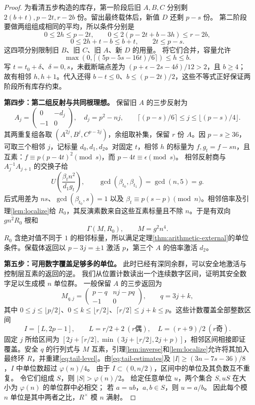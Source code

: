 \documentclass[11pt,a4paper,oneside,openany]{book}
\theoremstyle{definition}
\numberwithin{equation}{chapter}
\begin{document}
\begin{proof}
为看清五步构造的库存，第一阶段后旧 $A,B,C$ 分别剩
$2(b+t),p-2t,r-2b$ 份。留出最终载体后，新值 $D$ 还剩 $p-s$ 份。
第二阶段要做两组组成相同的平均，所以条件分别是
\[
0\le2h\le p-2t,\qquad
0\le2(p-2t+b-3h)\le r-2b,
\]
\[
0\le2h+t-b\le b+t,\qquad 2t\le p-s.
\]
这四项分别限制旧 $B$、旧 $C$、旧 $A$、新 $D$ 的用量。
将它们合并，容量允许
\[
\max(0,\lceil(5p-5s-16t)/6\rceil)\le h\le b.
\]
写 $t=t_0+\delta$、$\delta=0,s$，未截断端点差为 $(p+\epsilon-2s-4\delta)/12>2$，且 $b\ge4$；故有相邻 $h,h+1$。代入还得 $b-t\le0$、$b\le(p-2t)/2$，这些不等式正好保证两阶段所有库存约束。


\par\noindent\textbf{第四步：第二组反射与共同根理想。}
保留旧 $A$ 的三步反射为
\[
A_j=\begin{pmatrix}0&-d_j\\-1&0\end{pmatrix},\quad d_j=p^2-nj,\qquad
\lceil(p-s)/6\rceil\le j\le\lfloor(p-s)/4\rfloor.
\]
其两重复组各取 $(A^{2j},B^j,C^{p-3j})$，余组取补集，保留 $r$ 份 $A$。因 $p-s\ge36$，可取三个相邻 $j$，记标量 $d_0,d_1,d_2$。对固定 $t$，相邻 $h$ 的标量为 $f,g_t=f-sn$，且互素：$f\equiv p(p-4t)^2\pmod s$，而 $p-4t\equiv\epsilon\pmod s$。
相邻反射商与 $A_j^{-1}A_{j+1}$ 的交换子给
\[
U\left(\frac{\beta_t n^2}{d_1g_t}\right),\qquad
\gcd(\beta_{t_0},\beta_{t_1})=\gcd(n,5)=g.
\]
后式用差为 $ns$、$\gcd(\beta_{t_0},s)=1$ 以及 $\beta_t\equiv p(s-p)\pmod n$。相邻倍率及引理\ref{lem:localize}给 $R_0$，其反演素数来自这些互素标量且不除 $n$。于是有双向 $gn^2R_0$ 根和
\begin{equation}\label{eq:tail-level}
\Gamma(M,R_0),\qquad M=g^2n^4.
\end{equation}
$R_0$ 含绝对值不同于 $1$ 的相邻标量，所以满足定理\ref{thm:arithmetic-external}的单位条件。保载体返回以 $p-3j=\pm1$ 激活 $p$，第三个 $A$ 的倍率激活 $d_2$。


\par\noindent\textbf{第五步：可用数字覆盖足够多的单位。}
此时已经有深同余群，可以安全地激活与控制层互素的返回的逆。
我们从位置计数读出一个连续数字区间，证明其安全数字足以生成模 $n$ 单位群。
一般保留 $A$ 的三步返回为
\[
M_{q,j}=\begin{pmatrix}p-q&nj-pq\\-1&0\end{pmatrix},\qquad q=3j+k,
\]
其中 $0\le j\le\lfloor p/2\rfloor$、$0\le k\le\lfloor r/2\rfloor$、$\lceil r/2\rceil\le j+k\le p$。这些计数覆盖全部整数区间
\[
I=[L,2p-1],\qquad L=r/2+2\ (r\text{偶}),\quad L=(r+9)/2\ (r\text{奇}).
\]
固定 $j$ 所给区间为 $[2j+\lceil r/2\rceil,\min(3j+\lfloor r/2\rfloor,2j+p)]$，相邻区间相接即证覆盖。安全 $q$ 的行列式与 $M$ 互素，引理\ref{lem:inverse}和\ref{lem:localize}允许将其加入最终环 $R$，并重建\eqref{eq:tail-level}。由\eqref{eq:tail-estimates}及 $|I|\ge(3n-7s-36)/8$，$I$ 中单位数超过 $\varphi(n)/4$。
由于 $I\subset(0,n/2)$，区间中的单位及其负数互不重复。
令它们组成 $S$，则 $|S|>\varphi(n)/2$。
给定任意单位 $u$，两个集合 $S,uS$ 在大小为 $\varphi(n)$ 的单位群中必相交；
若 $a=ub$，$a,b\in S$，则 $u=a/b$。
因此每个模 $n$ 单位是其中两者之比，$R^\times$ 模 $n$ 满射。



\end{proof}
\end{document}
